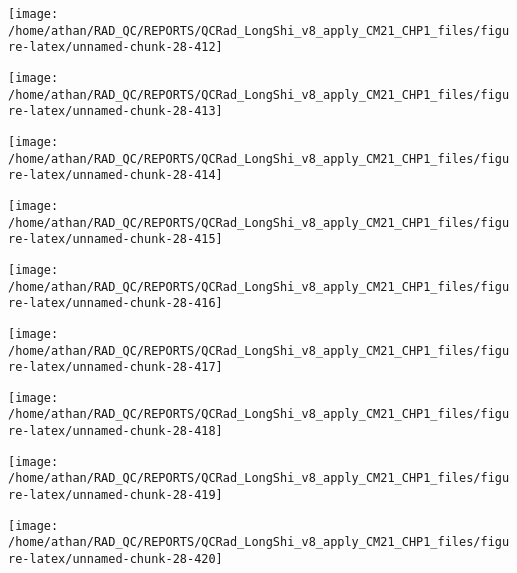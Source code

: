 \documentclass[
  10pt,
  a4paper,oneside]{article}
\begin{document}
\begin{center}\texttt{[image: /home/athan/RAD\_QC/REPORTS/QCRad\_LongShi\_v8\_apply\_CM21\_CHP1\_files/figure-latex/unnamed-chunk-28-412]} \end{center}

\begin{center}\texttt{[image: /home/athan/RAD\_QC/REPORTS/QCRad\_LongShi\_v8\_apply\_CM21\_CHP1\_files/figure-latex/unnamed-chunk-28-413]} \end{center}

\begin{center}\texttt{[image: /home/athan/RAD\_QC/REPORTS/QCRad\_LongShi\_v8\_apply\_CM21\_CHP1\_files/figure-latex/unnamed-chunk-28-414]} \end{center}

\begin{center}\texttt{[image: /home/athan/RAD\_QC/REPORTS/QCRad\_LongShi\_v8\_apply\_CM21\_CHP1\_files/figure-latex/unnamed-chunk-28-415]} \end{center}

\begin{center}\texttt{[image: /home/athan/RAD\_QC/REPORTS/QCRad\_LongShi\_v8\_apply\_CM21\_CHP1\_files/figure-latex/unnamed-chunk-28-416]} \end{center}

\begin{center}\texttt{[image: /home/athan/RAD\_QC/REPORTS/QCRad\_LongShi\_v8\_apply\_CM21\_CHP1\_files/figure-latex/unnamed-chunk-28-417]} \end{center}

\begin{center}\texttt{[image: /home/athan/RAD\_QC/REPORTS/QCRad\_LongShi\_v8\_apply\_CM21\_CHP1\_files/figure-latex/unnamed-chunk-28-418]} \end{center}

\begin{center}\texttt{[image: /home/athan/RAD\_QC/REPORTS/QCRad\_LongShi\_v8\_apply\_CM21\_CHP1\_files/figure-latex/unnamed-chunk-28-419]} \end{center}

\begin{center}\texttt{[image: /home/athan/RAD\_QC/REPORTS/QCRad\_LongShi\_v8\_apply\_CM21\_CHP1\_files/figure-latex/unnamed-chunk-28-420]} \end{center}
\end{document}
